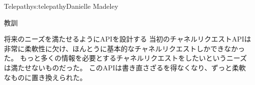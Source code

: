 \begin{aosachapter}{Telepathy}{s:telepathy}{Danielle Madeley}
\begin{aosasect1}{教訓}
\begin{aosadescription}
  \item{将来のニーズを満たせるようにAPIを設計する}
  当初のチャネルリクエストAPIは非常に柔軟性に欠け、ほんとうに基本的なチャネルリクエストしかできなかった。
  もっと多くの情報を必要とするチャネルリクエストをしたいというニーズは満たせないものだった。
  このAPIは書き直さざるを得なくなり、ずっと柔軟なものに置き換えられた。

\end{aosadescription}

\end{aosasect1}

\end{aosachapter}
